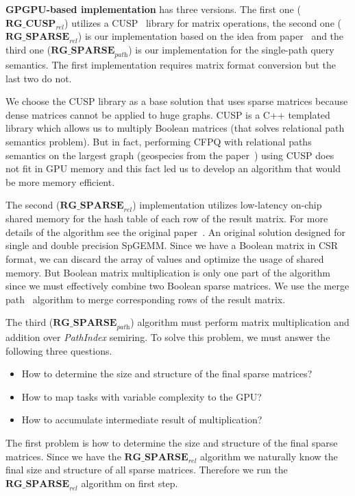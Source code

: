 \textbf{GPGPU-based implementation} has three versions.
The first one ($\textbf{RG\_CUSP}_{\textit{rel}}$) utilizes a CUSP~\cite{Cusp} library for matrix operations, the second one ($\textbf{RG\_SPARSE}_{\textit{rel}}$) is our implementation based on the idea from paper~\cite{NsparsePaper} and the third one ($\textbf{RG\_SPARSE}_{\textit{path}}$) is our implementation for the single-path query semantics.
The first implementation requires matrix format conversion but the last two do not.

We choose the CUSP library as a base solution that uses sparse matrices because dense matrices cannot be applied to huge graphs. CUSP is a C++ templated library which allows us to multiply Boolean matrices (that solves relational path semantics problem). But in fact, performing CFPQ with relational paths semantics on the largest graph (geospecies from the paper~\cite{Kuijpers:2019:ESC:3335783.3335791}) using CUSP does not fit in GPU memory and this fact led us to develop an algorithm that would be more memory efficient.

The second ($\textbf{RG\_SPARSE}_{\textit{rel}}$) implementation utilizes low-latency on-chip shared memory for the hash table of each row of the result matrix. For more details of the algorithm see the original paper~\cite{NsparsePaper}. An original solution designed for single and double precision SpGEMM. Since we have a Boolean matrix in CSR format, we can discard the array of values and optimize the usage of shared memory. But Boolean matrix multiplication is only one part of the algorithm since we must effectively combine two Boolean sparse matrices. We use the merge path~\cite{GpuMergePathPaper} algorithm to merge corresponding rows of the result matrix.

The third ($\textbf{RG\_SPARSE}_{\textit{path}}$) algorithm must perform matrix multiplication and addition over \textit{PathIndex} semiring. To solve this problem, we must answer the following three questions. 

\begin{itemize}
  \item How to determine the size and structure of the final sparse matrices?
  \item How to map tasks with variable complexity to the GPU?
  \item How to accumulate intermediate result of multiplication?
\end{itemize}

The first problem is how to determine the size and structure of the final sparse matrices. Since we have the $\textbf{RG\_SPARSE}_{\textit{rel}}$ algorithm we naturally know the final size and structure of all sparse matrices. Therefore we run the $\textbf{RG\_SPARSE}_{\textit{rel}}$ algorithm on first step.

